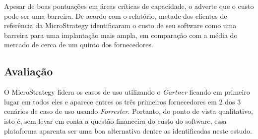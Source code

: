 Apesar de boas pontuações em áreas críticas de capacidade, o \relGCC \xspace adverte que o custo pode ser uma barreira. De acordo com o relatório, metade dos clientes de referência da MicroStrategy identificaram o custo de seu software como uma barreira para uma implantação mais ampla, em comparação com a média do mercado de cerca de um quinto dos fornecedores.

\subsection*{Avaliação}

O MicroStrategy lidera os casos de uso utilizando o \emph{Gartner} ficando em primeiro lugar em todos eles e aparece entres os três primeiros fornecedores em 2 dos 3 cenários de caso de uso usando \emph{Forrester}. Portanto, do ponto de vista qualitativo, isto é, sem levar em conta a questão financeira do custo do software, essa plataforma aparenta ser uma boa alternativa dentre as identificadas neste estudo. 
